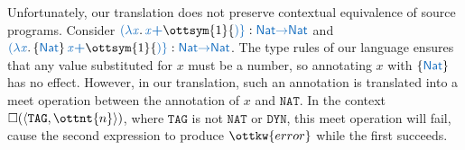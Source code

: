 \documentclass[11pt]{article}
\newcommand{\blue}[1]{ {\color{RoyalBlue}{{#1}}} }
\begin{document}
Unfortunately, our translation does not preserve contextual equivalence of source programs.
Consider $ \blue{(}    \blue{\lambda  \mathit{x} }  \ldotp   \blue{ \mathit{x} }    \blue{\boldsymbol{+} }  \ottsym{1}   \blue{)}  :   \blue{\mathsf{Nat} }  \blue{\to}  \blue{\mathsf{Nat} }  $ and $ \blue{(}    \blue{\lambda  \mathit{x} }  \ldotp   \{   \blue{\mathsf{Nat} }   \}  \,  \blue{ \mathit{x} }    \blue{\boldsymbol{+} }  \ottsym{1}   \blue{)}  :   \blue{\mathsf{Nat} }  \blue{\to}  \blue{\mathsf{Nat} }  $.
The type rules of our language ensures that any value substituted for $\mathit{x}$ must be a number,
so annotating $\mathit{x}$ with $ \{   \blue{\mathsf{Nat} }   \} $ has no effect.
However, in our translation, such an annotation is translated into a meet operation between the annotation
of $\mathit{x}$ and $ \mathtt{NAT } $. In the context $\square( \langle  \mathtt{ TAG } ,  \ottnt{n} \rangle )$, where $\mathtt{ TAG }$ is not $ \mathtt{NAT } $ or $ \mathtt{ DYN } $,
this meet operation will fail, cause the second expression to produce $\ottkw{error}$ while the first succeeds.
 

  
\end{document}
